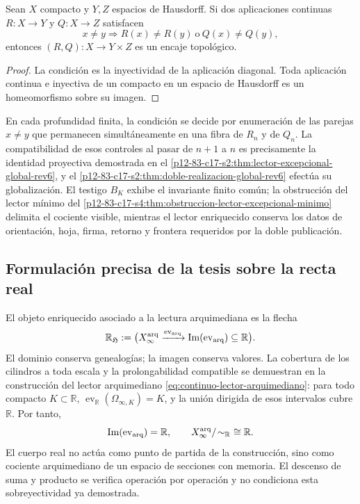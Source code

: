 \begin{theorem}
Sean \(X\) compacto y \(Y,Z\) espacios de Hausdorff. Si dos aplicaciones
continuas \(R:X\to Y\) y \(Q:X\to Z\) satisfacen
\[
 x\neq y\Longrightarrow R(x)\neq R(y)\ \text{o}\ Q(x)\neq Q(y),
\]
entonces \((R,Q):X\to Y\times Z\) es un encaje topológico.
\end{theorem}

\begin{proof}
La condición es la inyectividad de la aplicación diagonal. Toda aplicación
continua e inyectiva de un compacto en un espacio de Hausdorff es un
homeomorfismo sobre su imagen.
\end{proof}

En cada profundidad finita, la condición se decide por enumeración de las
parejas \(x\neq y\) que permanecen simultáneamente en una fibra de \(R_n\) y
de \(Q_n\). La compatibilidad de esos controles al pasar de \(n+1\) a \(n\)
es precisamente la identidad proyectiva demostrada en el
\cref{p12-83-c17-s2:thm:lector-excepcional-global-rev6}, y el
\cref{p12-83-c17-s2:thm:doble-realizacion-global-rev6} efectúa su
globalización. El testigo \(B_K\) exhibe el invariante finito común; la
obstrucción del lector mínimo del
\cref{p12-83-c17-s4:thm:obstruccion-lector-excepcional-minimo} delimita el
cociente visible, mientras el lector enriquecido conserva los datos de
orientación, hoja, firma, retorno y frontera requeridos por la doble
publicación.

\subsection{Formulación precisa de la tesis sobre la recta real}

El objeto enriquecido asociado a la lectura arquimediana es la flecha
\[
 \mathbb R_{\mathfrak H}:=
 \bigl(X_\infty^{\rm arq}
 \xrightarrow{\operatorname{ev}_{\rm arq}}
 \operatorname{Im}(\operatorname{ev}_{\rm arq})\subseteq\mathbb R\bigr).
\]
El dominio conserva genealogías; la imagen conserva valores. La cobertura de
los cilindros a toda escala y la prolongabilidad compatible se demuestran en
la construcción del lector arquimediano
\eqref{eq:continuo-lector-arquimediano}: para todo compacto
\(K\subset\mathbb R\),
\(\operatorname{ev}_{\mathbb R}(\Omega_{\infty,K})=K\), y la unión dirigida
de esos intervalos cubre \(\mathbb R\). Por tanto,
\[
 \operatorname{Im}(\operatorname{ev}_{\rm arq})=\mathbb R,
 \qquad
 X_\infty^{\rm arq}/\!\sim_{\mathbb R}\ \cong\mathbb R.
\]
El cuerpo real no actúa como punto de partida de la construcción, sino como
cociente arquimediano de un espacio de secciones con memoria. El descenso de
suma y producto se verifica operación por operación y no condiciona esta
sobreyectividad ya demostrada.

